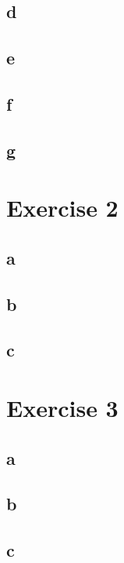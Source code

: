 \documentclass{article}
\begin{document}
\subsection*{d}

\subsection*{e}

\subsection*{f}

\subsection*{g}


\section*{Exercise 2}
\subsection*{a}

\subsection*{b}

\subsection*{c}


\section*{Exercise 3}
\subsection*{a}

\subsection*{b}

\subsection*{c}



\end{document}
